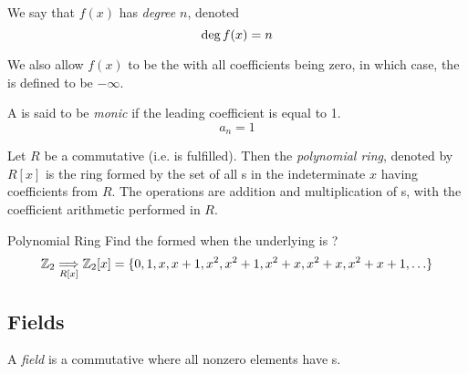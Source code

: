 \begin{definition}[Degree]\label{def:Polynomial_Degree}
  We say that $f(x)$ has \emph{degree} $n$, denoted
  \begin{equation}\label{eq:Polynomial_Degree}
    \operatorname{\text{deg}} f(x) = n
  \end{equation}

  \begin{remark}
    We also allow $f(x)$ to be the  with all coefficients being zero, in which case, the  is defined to be $-\infty$.
  \end{remark}
\end{definition}

\begin{definition}[Monic]\label{def:Monic_Polynomial}
  A  is said to be \emph{monic} if the leading coefficient is equal to 1.
  \begin{equation}\label{eq:Monic_Polynomial}
    a_{n} = 1
  \end{equation}
\end{definition}

\begin{definition}\label{def:Polynomial_Ring}
  Let $R$ be a commutative  (i.e.  is fulfilled).
  Then the \emph{polynomial ring}, denoted by $R[x]$ is the ring formed by the set of all s in the indeterminate $x$ having coefficients from $R$.
  The operations are addition and multiplication of s, with the coefficient arithmetic performed in $R$.
\end{definition}

\begin{example}[Lecture 2]{Polynomial Ring}
  Find the  formed when the underlying  is ?
  \tcblower{}
  \begin{equation*}
    \operatorname{\mathbb{Z}}_{2} \underset{R[x]}{\Longrightarrow} \operatorname{\mathbb{Z}}_{2}[x] = \lbrace 0, 1, x, x+1, x^{2}, x^{2}+1, x^{2}+x, x^{2}+x, x^{2}+x+1, \ldots \rbrace
  \end{equation*}
\end{example}

\subsection{Fields}\label{subsec:Fields}
\begin{definition}[Field]\label{def:Field}
  A \emph{field} is a commutative  where all nonzero elements have s.
\end{definition}

